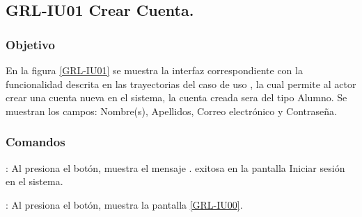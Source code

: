 \clearpage
\subsection{GRL-IU01 Crear Cuenta.}

\subsubsection{Objetivo}
En la figura \ref{GRL-IU01} se muestra la interfaz correspondiente con la funcionalidad descrita en las
trayectorias del caso de uso  , la cual permite al actor crear una cuenta
nueva en el sistema, la cuenta creada sera del tipo Alumno.
Se muestran los campos: Nombre(s), Apellidos, Correo electrónico y
Contraseña.

\subsubsection{Comandos}


\Titem {} : Al presiona el botón, muestra el mensaje . exitosa en la
pantalla Iniciar sesión en el sistema.

\Titem {} : Al presiona el botón, muestra la pantalla \ref{GRL-IU00}.



\clearpage
